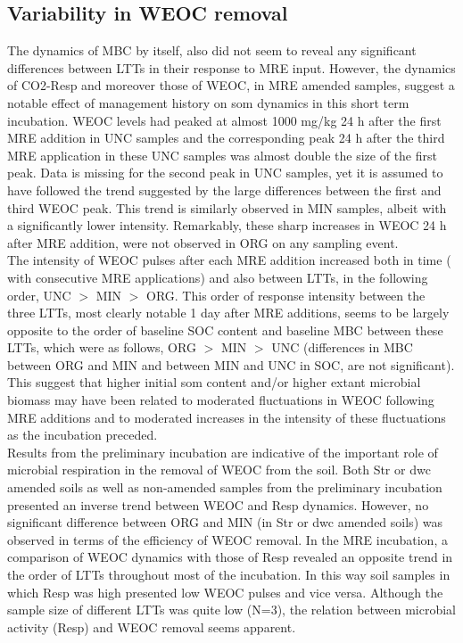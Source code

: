 \documentclass[12pt]{report}
\begin{document}
		\subsection{Variability in WEOC removal}
		The dynamics of MBC by itself, also did not seem to reveal any significant differences between LTTs in their response to MRE input.
		However, the dynamics of CO2-Resp and moreover those of WEOC, in MRE amended samples, suggest a notable effect of management history on \gls{som} dynamics in this short term incubation. WEOC levels had peaked at almost 1000 mg/kg  24 h after the first MRE addition in UNC samples and the corresponding peak 24 h after the third MRE application in these UNC samples was almost double the size of the first peak. Data is missing for the second peak in UNC samples, yet it is assumed to have followed the trend suggested by the large differences between the first and third WEOC peak. This trend is similarly observed in MIN samples, albeit with a significantly lower intensity. Remarkably, these sharp increases in WEOC 24 h after MRE addition, were not observed in ORG on any sampling event.\\
		The intensity of WEOC pulses after each MRE addition increased both in time ( with consecutive MRE applications) and also between LTTs, in the following order, UNC $ > $ MIN $ > $ ORG. This order of response intensity between the three LTTs, most clearly notable 1 day after MRE additions, seems to be largely opposite to the order of baseline SOC content and baseline MBC between these LTTs, which were as follows, ORG $ > $ MIN $ > $ UNC (differences in MBC between ORG and MIN and between MIN and UNC in SOC, are not significant). This suggest  that higher initial \gls{som} content and/or higher extant microbial biomass may have been related to moderated fluctuations in WEOC following MRE additions and to moderated increases in the intensity of these fluctuations as the incubation preceded. \\
		Results from the preliminary incubation are indicative of the important role of microbial respiration in the removal of WEOC from the soil. Both Str or \gls{dwc} amended soils as well as non-amended samples from the preliminary incubation presented an inverse trend between WEOC and Resp dynamics. However, no significant difference between ORG and MIN (in Str or \gls{dwc} amended soils) was observed in terms of the efficiency of WEOC removal. In the MRE incubation, a comparison of WEOC dynamics with those of Resp revealed an opposite trend in the order of LTTs throughout most of the incubation. In this way soil samples in which Resp was high presented low WEOC pulses and vice versa. Although the sample size of different LTTs was quite low (N=3), the relation between microbial activity (Resp) and WEOC removal seems apparent. \\
		
\end{document}
